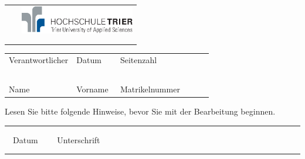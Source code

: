 \thispagestyle{empty}
	\begin{tabularx}{\textwidth}{Xr}
		\huge\textbf{\printklausurlabel~\printsemester}
		&
		\includegraphics[width=5.0cm]{logo_hochschule.eps}\\\\
		\multicolumn{2}{l}{\LARGE \printveranstaltung}
	\end{tabularx}				
\singlespacing
\setlength{\tabcolsep}{.1cm}
	\begin{table}[h]
	\small
	\begin{tabularx}{\textwidth}{|X|l|l|}
		\hline
		Verantwortlicher & Datum & Seitenzahl\\[0.2cm]
		~~ \printdozent & ~~ {\large \printdatum} ~~~~~~ & ~~{\large \pageref{LastPage}}\\
		\hline
		Name & Vorname & Matrikelnummer~~~~~~\\[0.6cm]
		\hline
	\end{tabularx}
	\end{table}
	\setlength{\columnsep}{1cm}
	\begin{multicols}{2}
		\begin{flushleft}
		Lesen Sie bitte folgende Hinweise, bevor Sie mit der Bearbeitung beginnen.
		\end{flushleft}
			
		\vspace{1cm}
		\begin{flushleft}
		\small
			\hrule \vspace{2mm}
			~~Datum ~~~~Unterschrift
		\end{flushleft}
		\columnbreak
		\setlength\extrarowheight{.12cm}
		 	\gradetable[v][questions]

	\end{multicols}
	\vspace{1cm}
	\hspace*{-35cm}
	\textcolor{fsi}{\rule{64.9cm}{15pt}}